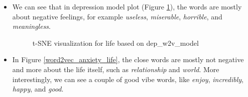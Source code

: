 \documentclass[12pt, a4paper]{article}
\begin{document}
	\begin{itemize}
		\item We can see that in depression model plot (Figure \ref{word2vec_depression_life}), the words are mostly about negative feelings, for example \textit{useless}, \textit{miserable}, \textit{horrible}, and \textit{meaningless}.
		
		\begin{figure}[H]
			\caption{t-SNE visualization for life based on dep\_w2v\_model}
			\label{word2vec_depression_life}
		\end{figure}
	
	
		\item In Figure \ref{word2vec_anxiety_life}, the close words are mostly not negative and more about the life itself, such as \textit{relationship} and \textit{world}. More interestingly, we can see a couple of good vibe words, like \textit{enjoy}, \textit{incredibly}, \textit{happy}, and \textit{good}.
			

\end{itemize}
\end{document}
